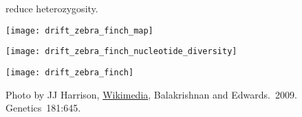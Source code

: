 \documentclass[t]{beamer}
\begin{document}

\begin{frame}[t]{ reduce heterozygosity.}

\vspace{-\baselineskip}

\begin{multicols}{2}

\texttt{[image: drift\_zebra\_finch\_map]}


\columnbreak

\texttt{[image: drift\_zebra\_finch\_nucleotide\_diversity]}

\bigskip

\centering

\texttt{[image: drift\_zebra\_finch]}

\end{multicols}




\vfilll

\tiny Photo by JJ Harrison, \href{https://commons.wikimedia.org/wiki/File:Taeniopygia_guttata_-_Bushell's_Lagoon.jpg}{Wikimedia},  \hfill Balakrishnan and Edwards.~2009. Genetics~181:645.

\end{frame}
\end{document}
